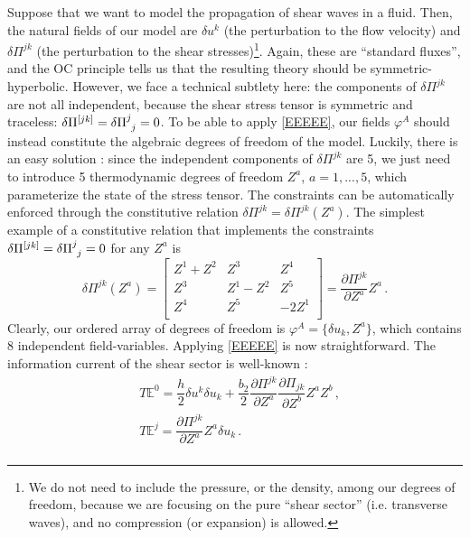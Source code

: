 \documentclass[a4paper, amsfonts, amssymb, amsmath, reprint, showkeys, nofootinbib, twoside, onecolumn,notitlepage]{revtex4-1}
\begin{document}
Suppose that we want to model the propagation of shear waves in a fluid. Then, the natural fields of our model are $\delta u^k$ (the perturbation to the flow velocity) and $\delta \Pi^{jk}$ (the perturbation to the shear stresses)\footnote{We do not need to include the pressure, or the density, among our degrees of freedom, because we are focusing on the pure ``shear sector'' (i.e. transverse waves), and no compression (or expansion) is allowed.}. 
Again, these are ``standard fluxes'', and the OC principle tells us that the resulting theory should be symmetric-hyperbolic. However, we face a technical subtlety here: the components of $\delta \Pi^{jk}$ are not all independent, because the shear stress tensor is symmetric and traceless: $\delta \Pi^{[jk]}=\delta \Pi \indices{^j _j}=0$. To be able to apply \eqref{EEEEE}, our fields $\varphi^A$ should instead constitute the algebraic degrees of freedom of the model. 
Luckily, there is an easy solution \cite{GavassinoNonHydro2022}: since the independent components of $\delta \Pi^{jk}$ are 5, we just need to introduce 5 thermodynamic degrees of freedom $Z^a$, $a=1,...,5$, which parameterize the state of the stress tensor. The constraints can be automatically enforced through the constitutive relation $\delta\Pi^{jk}=\delta\Pi^{jk}(Z^a)$. The simplest example of a constitutive relation that implements the constraints $\delta \Pi^{[jk]}=\delta \Pi \indices{^j _j}=0$ for any $Z^a$ is
\begin{equation}\label{akj}
\delta \Pi^{jk}(Z^a) =
\begin{bmatrix}
   Z^1+Z^2 & Z^3 & Z^4  \\
  Z^3 & Z^1-Z^2 & Z^5\\
  Z^4 & Z^5 & -2Z^1  \\
\end{bmatrix} = \dfrac{\partial \Pi^{jk}}{\partial Z^a} Z^a \, .
\end{equation} 
Clearly, our ordered array of degrees of freedom is $\varphi^A=\{ \delta u_k, Z^a \}$, which contains 8 independent field-variables. Applying \eqref{EEEEE} is now straightforward. The information current of the shear sector is well-known \cite{Hishcock1983,GavassinoGibbs2021,Almaalol2022}:
\begin{equation}
\begin{split}
& T\mathbb{E}^0= \dfrac{h}{2} \delta u^k \delta u_k + \dfrac{b_2}{2} \dfrac{\partial \Pi^{jk}}{\partial Z^a} \dfrac{\partial \Pi_{jk}}{\partial Z^b} Z^a Z^b \, , \\
& T\mathbb{E}^j= \dfrac{\partial \Pi^{jk}}{\partial Z^a} Z^a  \delta u_k  \, . \\
\end{split}
\end{equation}
\end{document}
